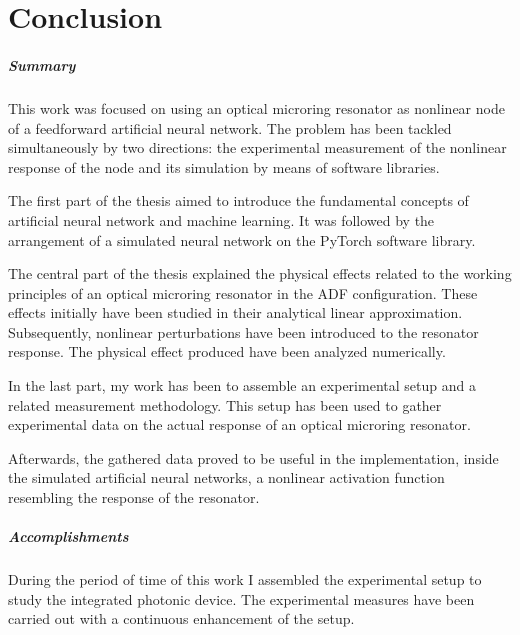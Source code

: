 \chapter*{Conclusion}

\paragraph{Summary\\}
This work was focused on using an optical microring resonator as nonlinear node of a feedforward artificial neural network.
The problem has been tackled simultaneously by two directions: the experimental measurement of the nonlinear response of the node and its simulation by means of software libraries.

The first part of the thesis aimed to introduce the fundamental concepts of artificial neural network and machine learning.
It was followed by the arrangement of a simulated neural network on the PyTorch software library.

The central part of the thesis explained the physical effects related to the working principles of an optical microring resonator in the \acl{ADF} configuration.
These effects initially have been studied in their analytical linear approximation.
Subsequently, nonlinear perturbations have been introduced to the resonator response.
The physical effect produced have been analyzed numerically.

In the last part, my work has been to assemble an experimental setup and a related measurement methodology.
This setup has been used to gather experimental data on the actual response of an optical microring resonator.

Afterwards, the gathered data proved to be useful in the implementation, inside the simulated artificial neural networks, a nonlinear activation function resembling the response of the resonator.

\paragraph{Accomplishments\\}
During the period of time of this work I assembled the experimental setup to study the integrated photonic device.
The experimental measures have been carried out with a continuous enhancement of the setup.

